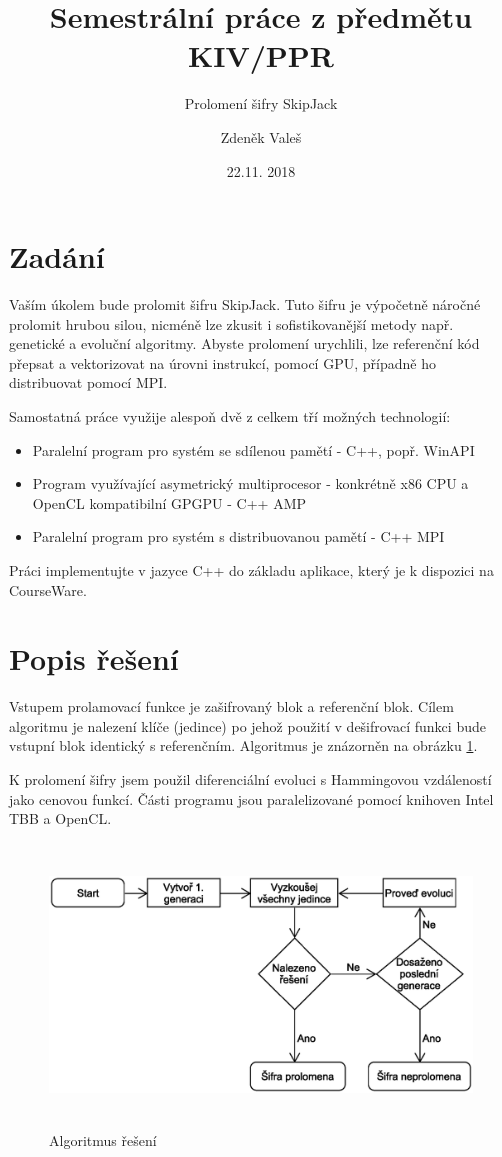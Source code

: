 \documentclass[11pt,a4paper]{scrartcl}
\begin{document}
	\title{Semestrální práce z předmětu KIV/PPR}
	\subtitle{Prolomení šifry SkipJack}
	\author{Zdeněk Valeš}
	\date{22.11. 2018}
	\maketitle
	\newpage
	
	\section{Zadání}
	Vaším úkolem bude prolomit šifru SkipJack. Tuto šifru je výpočetně náročné prolomit hrubou silou, nicméně lze zkusit i sofistikovanější metody např. genetické a evoluční algoritmy. Abyste prolomení urychlili, lze referenční kód přepsat a vektorizovat na úrovni instrukcí, pomocí GPU, případně ho distribuovat pomocí MPI.
	
	Samostatná práce využije alespoň dvě z celkem tří možných technologií:
	
	\begin{itemize}
		\item Paralelní program pro systém se sdílenou pamětí - C++, popř. WinAPI
		\item Program využívající asymetrický multiprocesor - konkrétně x86 CPU a OpenCL kompatibilní GPGPU - C++ AMP
		\item Paralelní program pro systém s distribuovanou pamětí - C++ MPI
	\end{itemize}

	Práci implementujte v jazyce C++ do základu aplikace, který je k dispozici na CourseWare.
	
	\section{Popis řešení}
	Vstupem prolamovací funkce je zašifrovaný blok a referenční blok. Cílem algoritmu je nalezení klíče (jedince) po jehož použití v dešifrovací funkci bude vstupní blok identický s referenčním. Algoritmus je znázorněn na obrázku \ref{fig:alg}.
	
	K prolomení šifry jsem použil diferenciální evoluci s Hammingovou vzdáleností jako cenovou funkcí. Části programu jsou paralelizované pomocí knihoven Intel TBB a OpenCL.
	
	\begin{figure}[!h]
		\centering
		\includegraphics[height=7.5cm]{img/alg-flowchart}
		\caption{Algoritmus řešení}
		\label{fig:alg}
	\end{figure}
	
\end{document}
